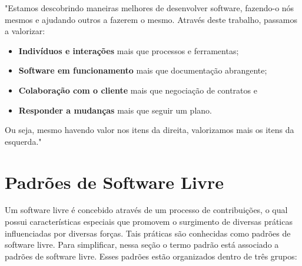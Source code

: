 "Estamos descobrindo maneiras melhores de desenvolver software, fazendo-o nós mesmos
e ajudando outros a fazerem o mesmo. Através deste trabalho, passamos a valorizar:

\begin{itemize}
\item \textbf{Indivíduos e interações} mais que processos e ferramentas;
\item \textbf{Software em funcionamento} mais que documentação abrangente;
\item \textbf{Colaboração com o cliente} mais que negociação de contratos e
\item \textbf{Responder a mudanças} mais que seguir um plano.
\end{itemize}

Ou seja, mesmo havendo valor nos itens da direita, valorizamos mais os itens da esquerda."


\section{Padrões de Software Livre}

Um software livre é concebido através de um processo de contribuições, o qual possui características especiais que promovem o surgimento de diversas práticas influenciadas por diversas forças. Tais práticas são conhecidas como padrões de software livre. Para simplificar, nessa seção o termo padrão está associado a padrões de software livre. Esses padrões estão organizados dentro de três grupos:

